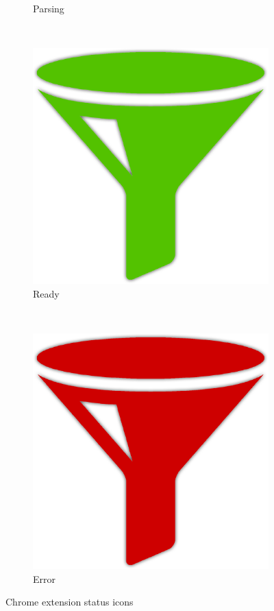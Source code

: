 \begin{figure}[H]
\begin{subfigure}[t]{0.25\textwidth}
        \caption{Parsing}
    \end{subfigure}%
    ~ 
    \begin{subfigure}[t]{0.25\textwidth}
        \centering
\label{fig:chromeReady}
        \includegraphics[scale=\figureScale]{Figures/greenPlain}
        \caption{Ready}
    \end{subfigure}%
    ~ 
    \begin{subfigure}[t]{0.25\textwidth}
        \centering
\label{fig:chromeError}
        \includegraphics[scale=\figureScale]{Figures/redPlain}
        \caption{Error}
    \end{subfigure}%
	\label{fig:chromeExtensionIcons}
    \caption{Chrome extension status icons}
\end{figure}

